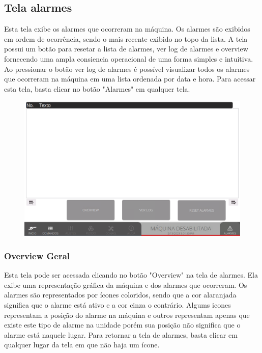 \pagestyle{fancy}
\vspace*{40 pt}

\subsection{Tela alarmes}

Esta tela exibe os alarmes que ocorreram na máquina. Os alarmes são exibidos em ordem de ocorrência, sendo o mais recente exibido no topo da lista.
A tela possui um botão para resetar a lista de alarmes, ver log de alarmes e overview fornecendo uma ampla consiencia operacional de uma forma simples e intuitiva.
Ao pressionar o botão ver log de alarmes é possível visualizar todos os alarmes que ocorreram na máquina em uma lista ordenada por data e hora.
Para acessar esta tela, basta clicar no botão "Alarmes" em qualquer tela.

\begin{figure}[h]
  \centering
  \includegraphics[width=480 px,height=300 px]{src/imagesICV/13-alarmsScreen/e-Tela-Principal.png}
\end{figure}

\newpage
\pagestyle{fancy}
\vspace*{40 pt}

\subsubsection{\small{Overview Geral}}

Esta tela pode ser acessada clicando no botão "Overview" na tela de alarmes. Ela exibe uma representação gráfica da máquina e dos alarmes que ocorreram. 
Os alarmes são representados por ícones coloridos, sendo que a cor alaranjada significa que o alarme está ativo e a cor cinza o contrário. Algums icones representam
a posição do alarme na máquina e outros representam apenas que existe este tipo de alarme na unidade porém sua posição não significa que o alarme está naquele lugar. Para
retornar a tela de alarmes, basta clicar em qualquer lugar da tela em que não haja um ícone.

